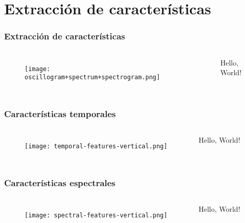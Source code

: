 \section{Extracción de características}\label{sec:features}

\begin{frame}
    \frametitle{Extracción de características}

    \begin{columns}

        \begin{figure}[!h]
            \centering
            \texttt{[image: oscillogram+spectrum+spectrogram.png]}
        \end{figure}


        Hello, World!

    \end{columns}
\end{frame}

\begin{frame}
    \frametitle{Características temporales}

    \begin{columns}

        \begin{figure}[!h]
            \centering
            \texttt{[image: temporal-features-vertical.png]}
        \end{figure}


        Hello, World!

    \end{columns}
\end{frame}

\begin{frame}
    \frametitle{Características espectrales}

    \begin{columns}

        \begin{figure}[!h]
            \centering
            \texttt{[image: spectral-features-vertical.png]}
        \end{figure}


        Hello, World!

    \end{columns}
\end{frame}

